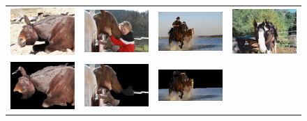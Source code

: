 \documentclass[10pt,twocolumn,letterpaper]{article}
\begin{document}
\begin{figure}[p]
\centering
\begin{tabular}{ p{4cm} p{4cm} p{4cm} p{4cm} }
\includegraphics[width=3.95cm]{figures/add_res/horse/2008_001542.jpg.eps} &
\includegraphics[width=3.95cm]{figures/add_res/horse/2008_001992.jpg.eps} &
\includegraphics[width=3.95cm]{figures/add_res/horse/2008_002172.jpg.eps} &
\includegraphics[width=3.95cm]{figures/add_res/horse/2008_002509.jpg.eps} \\
\includegraphics[width=3.95cm]{figures/add_res/horse/2008_001542.jpg_3_good.jpg.eps} &
\includegraphics[width=3.95cm]{figures/add_res/horse/2008_001992.jpg_3_good.jpg.eps} &
\includegraphics[width=3.95cm]{figures/add_res/horse/2008_002172.jpg_3_good.jpg.eps} &

\end{tabular}
\end{figure}
\end{document}
